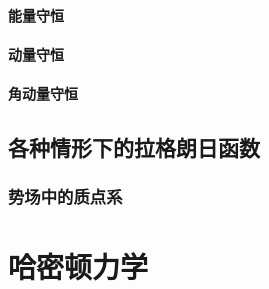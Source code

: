 \paragraph*{能量守恒}

\paragraph*{动量守恒}

\paragraph*{角动量守恒}

\subsection{各种情形下的拉格朗日函数}
\subsubsection{势场中的质点系}


\section{哈密顿力学}

